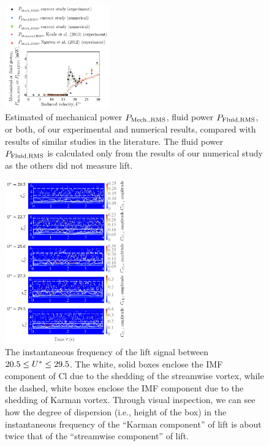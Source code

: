\documentclass[a4paper,fleqn]{cas-sc}
\begin{document}
\begin{figure}
  \centering
  \includegraphics[width=0.4\textwidth]{figs/figure20}
  \caption{Estimated \rms{} of mechanical power $P_{\text{Mech.,RMS}}$, fluid power $P_{\text{Fluid,RMS}}$, or both, of our experimental and numerical results, compared with results of similar studies in the literature. The fluid power $P_{\text{Fluid,RMS}}$ is calculated only from the results of our numerical study as the others did not measure lift.}
  \label{fig:powerComparison}
\end{figure}


\begin{figure}
  \centering
  \includegraphics[width=0.47\textwidth]{figs/figure21}
  \caption{The instantaneous frequency of the lift signal between $20.5 \leq U^{*} \leq 29.5$. The white, solid boxes enclose the IMF component of Cl due to the shedding of the streamwise vortex, while the dashed, white boxes enclose the IMF component due to the shedding of Karman vortex. Through visual inspection, we can see how the degree of dispersion (i.e., height of the box) in the instantaneous frequency of the ``Karman component'' of lift is about twice that of the ``streamwise component'' of lift.}
  \label{fig:instantLiftFreq}
\end{figure}
\end{document}

